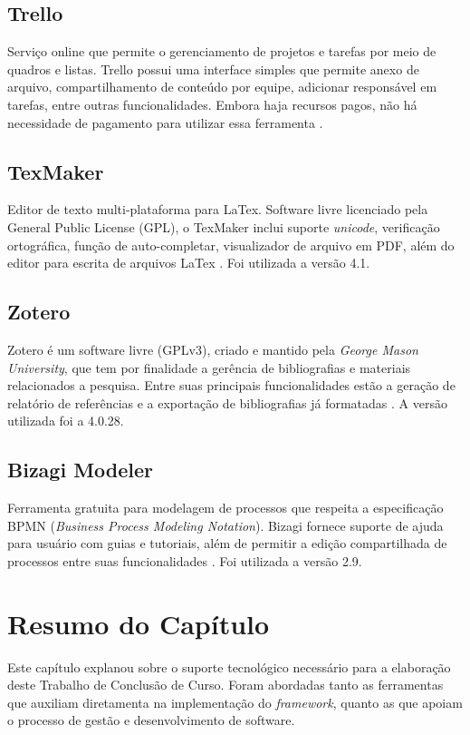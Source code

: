 \subsection{Trello} 
Serviço online que permite o gerenciamento de projetos e tarefas por meio de quadros e listas. Trello possui uma interface simples que permite anexo de arquivo, compartilhamento de conteúdo por equipe, adicionar responsável em tarefas,  entre outras funcionalidades. Embora haja recursos pagos, não há necessidade de pagamento para utilizar essa ferramenta \cite{trello}.

\subsection{TexMaker}
Editor de texto multi-plataforma para LaTex. Software livre licenciado pela General Public License (GPL), o TexMaker inclui suporte \textit{unicode}, verificação ortográfica, função de auto-completar, visualizador de arquivo em PDF, além do editor para escrita de arquivos LaTex \cite{texmaker}. Foi utilizada a versão 4.1.

\subsection{Zotero}
Zotero é um software livre (GPLv3), criado e mantido pela \textit{George Mason University}, que tem por finalidade a gerência de bibliografias e materiais relacionados a pesquisa. Entre suas principais funcionalidades estão a geração de relatório de referências e a exportação de bibliografias já formatadas \cite{zotero}. A versão utilizada foi a 4.0.28.

\subsection{Bizagi Modeler}
Ferramenta gratuita para modelagem de processos que respeita a especificação BPMN (\textit{Business Process Modeling Notation}). Bizagi fornece suporte de ajuda para usuário com guias e tutoriais, além de permitir a edição compartilhada de processos entre suas funcionalidades \cite{bizagi}. Foi utilizada a versão 2.9.

\section{Resumo do Capítulo}
Este capítulo explanou sobre o suporte tecnológico necessário para a elaboração deste Trabalho de Conclusão de Curso. Foram abordadas tanto as ferramentas que auxiliam diretamenta na implementação do \textit{framework}, quanto as que apoiam o processo de gestão e desenvolvimento de software.
